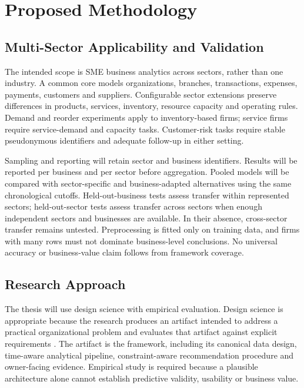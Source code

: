 \chapter{Proposed Methodology}
\label{chapter_methodology}

\section{Multi-Sector Applicability and Validation}

The intended scope is SME business analytics across sectors, rather than one
industry. A common core models organizations, branches, transactions, expenses,
payments, customers and suppliers. Configurable sector extensions preserve
differences in products, services, inventory, resource capacity and operating
rules. Demand and reorder experiments apply to inventory-based firms; service
firms require service-demand and capacity tasks. Customer-risk tasks require
stable pseudonymous identifiers and adequate follow-up in either setting.

Sampling and reporting will retain sector and business identifiers. Results
will be reported per business and per sector before aggregation. Pooled models
will be compared with sector-specific and business-adapted alternatives using
the same chronological cutoffs. Held-out-business tests assess transfer within
represented sectors; held-out-sector tests assess transfer across sectors when
enough independent sectors and businesses are available. In their absence,
cross-sector transfer remains untested. Preprocessing is fitted only on training
data, and firms with many rows must not dominate business-level conclusions.
No universal accuracy or business-value claim follows from framework coverage.

\section{Research Approach}

The thesis will use design science with empirical evaluation. Design science is
appropriate because the research produces an artifact intended to address a
practical organizational problem and evaluates that artifact against explicit
requirements \cite{hevner2004design}. The artifact is the \system{} framework,
including its canonical data design, time-aware analytical pipeline,
constraint-aware recommendation procedure and owner-facing evidence. Empirical
study is required because a plausible architecture alone cannot establish
predictive validity, usability or business value.

